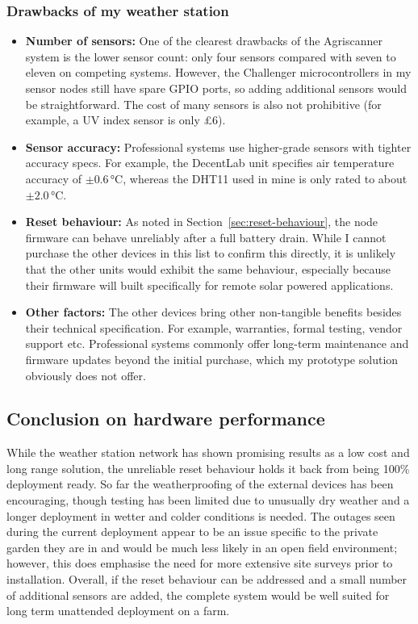\subsubsection{Drawbacks of my weather station}

\begin{itemize}
  \item \textbf{Number of sensors:} One of the clearest drawbacks of the
  Agriscanner system is the lower sensor count: only four sensors compared with
  seven to eleven on competing systems. However, the Challenger microcontrollers
  in my sensor nodes still have spare GPIO ports, so adding additional sensors
  would be straightforward. The cost of many sensors is also not prohibitive
  (for example, a UV index sensor is only \pounds{}6).
  \item \textbf{Sensor accuracy:} Professional systems use higher-grade sensors
  with tighter accuracy specs. For example, the DecentLab unit specifies air
  temperature accuracy of $\pm0.6\,\si{\celsius}$, whereas the DHT11 used in
  mine is only rated to about $\pm2.0\,\si{\celsius}$.
  \item \textbf{Reset behaviour:} As noted in Section~\ref{sec:reset-behaviour},
  the node firmware can behave unreliably after a full battery drain. While I
  cannot purchase the other devices in this list to confirm this directly, it is
  unlikely that the other units would exhibit the same behaviour, especially
  because their firmware will built specifically for remote solar powered
  applications.
  \item \textbf{Other factors:} The other devices bring other non-tangible
  benefits besides their technical specification. For example,  warranties,
  formal testing, vendor support etc. Professional systems commonly offer
  long-term maintenance and firmware updates beyond the initial purchase, which
  my prototype solution obviously does not offer. 
\end{itemize}

\subsection{Conclusion on hardware performance}

While the weather station network has shown promising results as a low cost and
long range solution, the unreliable reset behaviour holds it back from being
100\% deployment ready. So far the weatherproofing of the external devices has
been encouraging, though testing has been limited due to unusually dry weather
and a longer deployment in wetter and colder conditions is needed. The outages
seen during the current deployment appear to be an issue specific to the private
garden they are in and would be much less likely in an open field environment;
however, this does emphasise the need for more extensive site surveys prior to
installation. Overall, if the reset behaviour can be addressed and a small
number of additional sensors are added, the complete system would be well suited
for long term unattended deployment on a farm.